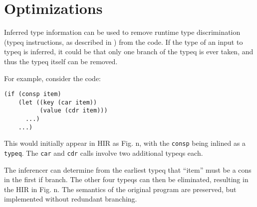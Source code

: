 \section{Optimizations}

Inferred type information can be used to remove runtime type
discrimination (typeq instructions, as described in )
from the code. If the type of an input to typeq is inferred, it could
be that only one branch of the typeq is ever taken, and thus the typeq
itself can be removed.

For example, consider the code:

\begin{verbatim}
(if (consp item)
    (let ((key (car item))
          (value (cdr item)))
      ...)
    ...)
\end{verbatim}

This would initially appear in HIR as Fig. n, with the \texttt{consp}
being inlined as a \texttt{typeq}. The \texttt{car} and \texttt{cdr}
calls involve two additional typeqs each.

The inferencer can determine from the earliest typeq that ``item'' must
be a cons in the first if branch. The other four typeqs can then be
eliminated, resulting in the HIR in Fig. n. The semantics of the
original program are preserved, but implemented without redundant
branching.
